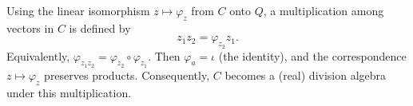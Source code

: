 Using the linear isomorphism $z \mapsto \varphi_z$ from $C$ onto $Q$, a multiplication among vectors in $C$ is defined by
$$
z_1 z_2 = \varphi_{z_2} z_1.
$$
Equivalently, $\varphi_{z_1 z_2} = \varphi_{z_2} \circ \varphi_{z_1}$. Then $\varphi_a = \iota$ (the identity), and the correspondence $z \mapsto \varphi_z$ preserves products. Consequently, $C$ becomes a (real) division algebra under this multiplication.
